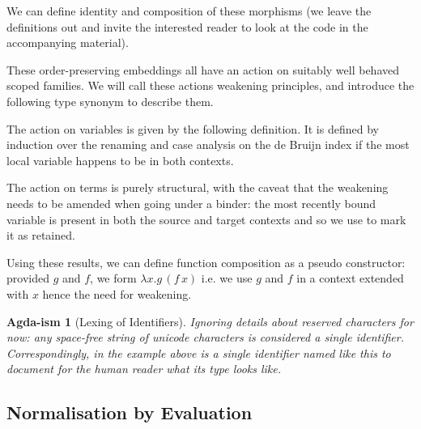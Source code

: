 \documentclass{article}
\newtheorem*{remark}{Agda-ism}
\begin{document}
We can define identity and composition of these morphisms (we leave
the definitions out and invite the interested reader to look
at the code in the accompanying material).

\noindent
\begin{minipage}{.3\textwidth}
\end{minipage}\hfill
\begin{minipage}{.5\textwidth}
\end{minipage}

These order-preserving embeddings all have an action on suitably
well behaved scoped families. We will call these actions weakening
principles, and introduce the following type synonym to describe them.


The action on variables is given
by the following  definition. It is defined by
induction over the renaming and case analysis on the de Bruijn
index if the most local variable happens to be in both contexts.


The action on terms is purely structural, with the caveat that
the weakening needs to be amended when going under a binder: the
most recently bound variable is present in both the source and
target contexts and so we use  to mark it as retained.


Using these results, we can define function composition
as a pseudo constructor: provided $g$ and $f$, we form
$λx.g\,(f\, x)$ i.e. we use $g$ and $f$ in a context extended
with $x$ hence the need for weakening.

\label{def:composition}

\begin{remark}[Lexing of Identifiers]
  Ignoring details about reserved characters for now: any
  space-free string of unicode characters is considered a
  single identifier.
  Correspondingly, in the example above  is a single
  identifier named like this to document for the human reader
  what its type looks like.
\end{remark}

\subsection{Normalisation by Evaluation}
\end{document}
